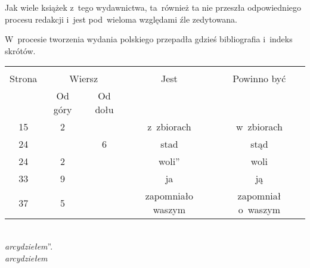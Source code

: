 \documentclass[a4paper,11pt]{article}
\begin{document}

\start Jak wiele książek z~tego wydawnictwa, ta~również ta nie
przeszła odpowiedniego procesu redakcji i~jest pod~wieloma względami
źle zedytowana.

\vspace{\spaceFour}


\start W~procesie tworzenia wydania polskiego przepadła gdzieś
bibliografia i~indeks skrótów.






\begin{center}

  \begin{tabular}{|c|c|c|c|c|}
    \hline
    & \multicolumn{2}{c|}{} & & \\
    Strona & \multicolumn{2}{c|}{Wiersz} & Jest
                              & Powinno być \\ \cline{2-3}
    & Od góry & Od dołu & & \\
    \hline
    15  &  2 & & z~zbiorach & w~zbiorach \\
    24  & &  6 & stad & stąd \\
    24  &  2 & & woli” & woli \\
    33  &  9 & & ja & ją \\
    37  &  5 & & zapomniało waszym & zapomniał o~waszym \\
    \hline
  \end{tabular}

\end{center}





\noindent
{} \\
\Jest  \emph{arcydziełem}”. \\
\Powin \emph{arcydziełem} \\

\vspace{\spaceTwo}










\end{document}
